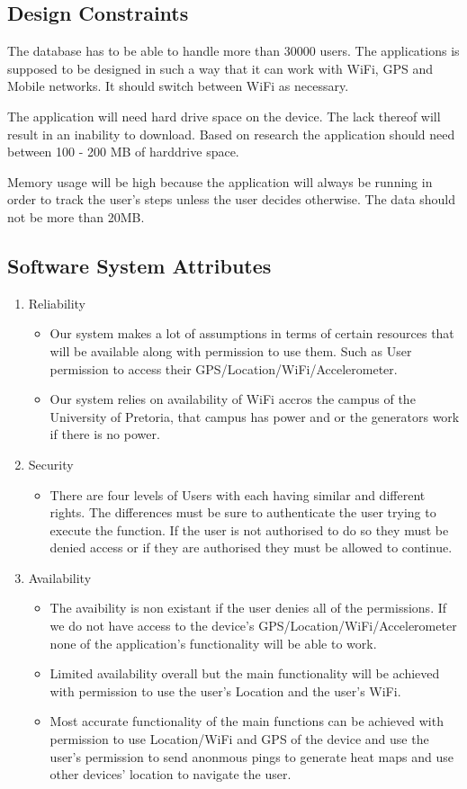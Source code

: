 \documentclass[11pt]{article}
\begin{document}
		\subsection{Design Constraints}
    		The database has to be able to handle more than 30000 users. The applications is supposed to be designed in such a way 			that it can work with WiFi, GPS and Mobile networks. It should switch between WiFi as necessary.

		    The application will need hard drive space on the device. The lack thereof will result in an inability to download. 			Based on research the application should need between 100 - 200 MB of harddrive space. 

		    Memory usage will be high because the application will always be running in order to track the user’s steps unless the 			user decides otherwise. The data should not be more than 20MB.

		\subsection{Software System Attributes}
			\begin{enumerate}
				\item Reliability 
					\begin{itemize}
						\item Our system makes a lot of assumptions in terms of certain resources that will be available along with permission to use them. Such as User permission to access their GPS/Location/WiFi/Accelerometer.
						\item Our system relies on availability of WiFi accros the campus of the University of Pretoria, that campus has power and or the generators work if there is no power.
					\end{itemize}
				\item Security 
					\begin{itemize}
						\item There are four levels of Users with each having similar and different rights. The differences must be sure to authenticate the user trying to execute the function. If the user is not authorised to do so they must be denied access or if they are authorised they must be allowed to continue.
					\end{itemize}
				\item Availability
					\begin{itemize}
						\item The avaibility is non existant if the user denies all of the permissions. If we do not have access to the device's GPS/Location/WiFi/Accelerometer none of the application's functionality will be able to work.
						\item Limited availability overall but the main functionality will be achieved with permission to use the user's Location and the user's WiFi.
						\item Most accurate functionality of the main functions can be achieved with permission to use Location/WiFi and GPS of the device and use the user's permission to send anonmous pings to generate heat maps and use other devices' location to navigate the user.
					\end{itemize}
			\end{enumerate}
	
\end{document}
